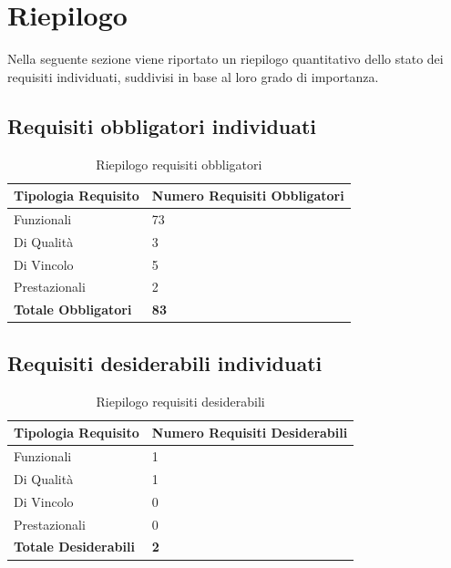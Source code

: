 
\section{Riepilogo}
Nella seguente sezione viene riportato un riepilogo quantitativo dello stato dei requisiti individuati, suddivisi in base al loro grado di importanza.

\subsection{Requisiti obbligatori individuati}
\begin{table}[ht]
	\centering
	\renewcommand{\arraystretch}{1.4}
	\begin{tabularx}{0.8\textwidth}{|l|X|}
		\hline
		\rowcolor{primarycolor!10}
		\textbf{Tipologia Requisito} & \textbf{Numero Requisiti Obbligatori} \\
		\hline
		Funzionali & 73 \\
		\hline
		Di Qualità & 3 \\
		\hline
		Di Vincolo & 5 \\
		\hline
		Prestazionali & 2 \\
		\hline
		\textbf{Totale Obbligatori} & \textbf{83} \\
		\hline
	\end{tabularx}
	\caption{Riepilogo requisiti obbligatori}
\end{table}

\subsection{Requisiti desiderabili individuati}
\begin{table}[ht]
	\centering
	\renewcommand{\arraystretch}{1.4}
	\begin{tabularx}{0.8\textwidth}{|l|X|}
		\hline
		\rowcolor{primarycolor!10}
		\textbf{Tipologia Requisito} & \textbf{Numero Requisiti Desiderabili} \\
		\hline
		Funzionali & 1 \\
		\hline
		Di Qualità & 1 \\
		\hline
		Di Vincolo & 0 \\
		\hline
		Prestazionali & 0 \\
		\hline
		\textbf{Totale Desiderabili} & \textbf{2} \\
		\hline
	\end{tabularx}
	\caption{Riepilogo requisiti desiderabili}
\end{table}

